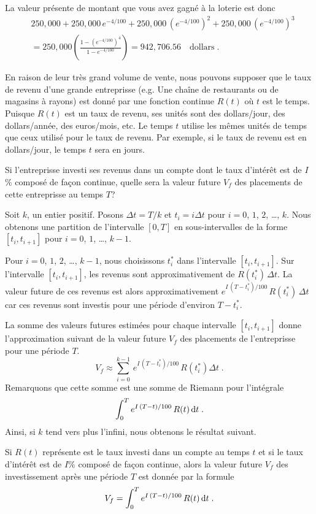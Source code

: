 {\begin{egg}
La valeur présente de montant que vous avez gagné à la loterie est donc
\begin{align*}
& 250,000 + 250,000\,e^{-4/100} + 250,000\,\left(e^{-4/100}\right)^2
+ 250,000\,\left(e^{-4/100}\right)^3 \\
&= 250, 000 \left( \frac{1- \left(e^{-4/100}\right)^4}{1-e^{-4/100}} \right)
= 942,706.56 \quad \text{dollars}\; .
\end{align*}
\end{egg}

En raison de leur très grand volume de vente, nous pouvons supposer que le
taux de revenu d'une grande entreprisse (e.g. Une chaîne de restaurants
ou de magasins à rayons) est donné par une fonction continue $R(t)$ où
$t$ est le temps.  Puisque $R(t)$ est un taux de revenu, ses unités
sont des dollars/jour, des dollars/année, des euros/mois, etc.  Le
temps $t$ utilise les mêmes unités de temps que ceux utilisé pour le
taux de revenu.  Par exemple, si le taux de revenu est en
dollars/jour, le temps $t$ sera en jours.

Si l'entreprisse investi ses revenus dans un compte dont le taux
d'intérêt est de $I$\% composé de façon continue, quelle sera la valeur
future $V_f$ des placements de cette entreprisse au temps $T$?

Soit $k$, un entier positif.  Posons
$\Delta t = T/k$ et $t_i = i \Delta t$
pour $i=0$, $1$, $2$, \ldots, $k$.  Nous obtenons une partition de l'intervalle
$[0,T]$ en sous-intervalles de la forme $[t_i,t_{i+1}]$ pour $i=0$, $1$,
\ldots, $k-1$.

Pour $i=0$, $1$, $2$, \ldots, $k-1$, nous choisissons $t_i^\ast$ dans
l'intervalle $[t_i,t_{i+1}]$.  Sur l'intervalle $[t_i, t_{i+1}]$, les
revenus sont approximativement de $R(t_i^\ast)\, \Delta t$.  La valeur
future de ces revenus est alors approximativement
$\displaystyle e^{I\,(T-t_i^\ast)/100} \,R(t_i^\ast)\, \Delta t$ car ces
revenus sont investis pour une période d'environ $T-t_i^\ast$.

La somme des valeurs futures estimées pour chaque intervalle
$[t_i,t_{i+1}]$ donne l'approximation suivant de la valeur future $V_f$
des placements de l'entreprisse pour une période $T$.
\[
V_f \approx \sum_{i=0}^{k-1} \,e^{I\,(T-t_i^\ast)/100} \,R(t_i^\ast) \Delta t \; .
\]
Remarquons que cette somme est une somme de Riemann pour l'intégrale
\[
\int_0^T e^{I\,(T-t)/100} \,R(t) \,\mathrm{d}t \; .
\]
Ainsi, si $k$ tend vers plus l'infini, nous obtenons le résultat suivant.

\begin{meth} 
Si $R(t)$ représente est le taux investi dans un compte au temps $t$
et si le taux d'intérêt est de $I$\% composé de façon continue, alors la
valeur future $V_f$ des investissement après une période $T$ est
donnée par la formule
\[
V_f = \int_0^T e^{I\,(T-t)/100} \,R(t) \,\mathrm{d}t \; .
\]
\end{meth}

}
